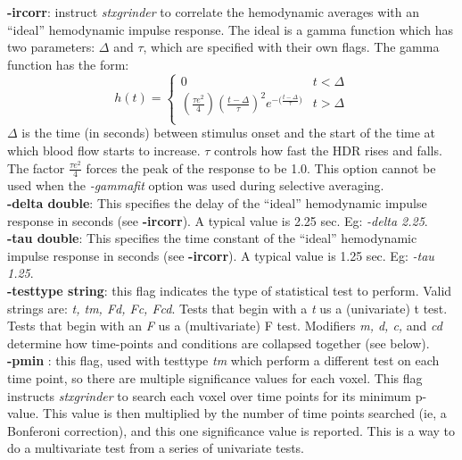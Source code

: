 \documentclass[10pt]{article}
\begin{document}
\noindent
{\bf -ircorr}: instruct {\em stxgrinder} to correlate the hemodynamic
averages with an ``ideal'' hemodynamic impulse response.  The ideal
is a gamma function which has two parameters: $\Delta$ and $\tau$,
which are specified with their own flags.
The gamma function has the form:
\begin{equation}
h(t) = 
\begin{cases}
0 & t < \Delta \\
(\frac{\tau e^2}{4})
( \frac{t-\Delta}{\tau} )^2 e^{{-(\frac{t-\Delta}{\tau}})} & t > \Delta \\
\end{cases}
\label{hideal.eqn}
\end{equation}
$\Delta$ is the time (in seconds) between stimulus onset and the start
of the time at which blood flow starts to increase.  $\tau$ controls
how fast the HDR rises and falls.  The factor $\frac{\tau e^2}{4}$
forces the peak of the response to be 1.0.  This option cannot be
used when the {\em -gammafit} option was used during selective averaging.\\

\noindent
{\bf -delta double}: This specifies the delay of the ``ideal''
hemodynamic impulse response in seconds (see {\bf -ircorr}).
A typical value is 2.25 sec. Eg: {\em -delta 2.25}.\\

\noindent
{\bf -tau double}: This specifies the time constant of the ``ideal''
hemodynamic impulse response in seconds (see {\bf -ircorr}).
A typical value is 1.25 sec. Eg: {\em -tau 1.25}.\\

\noindent
{\bf -testtype string}: this flag indicates the type of statistical
test to perform.  Valid strings are: {\em t, tm, Fd, Fc, Fcd}. Tests
that begin with a {\em t} us a (univariate) t test. Tests that begin
with an {\em F} us a (multivariate) F test. Modifiers {\em m, d, c,}
and {\em cd} determine how time-points and conditions are collapsed
together (see below).\\

\noindent
{\bf -pmin }: this flag, used with testtype {\em tm} which perform a
different test on each time point, so there are multiple significance
values for each voxel.  This flag instructs {\em stxgrinder} to search
each voxel over time points for its minimum p-value.  This value is
then multiplied by the number of time points searched (ie, a Bonferoni
correction), and this one significance value is reported. This is a
way to do a multivariate test from a series of univariate tests.\\
\end{document}
